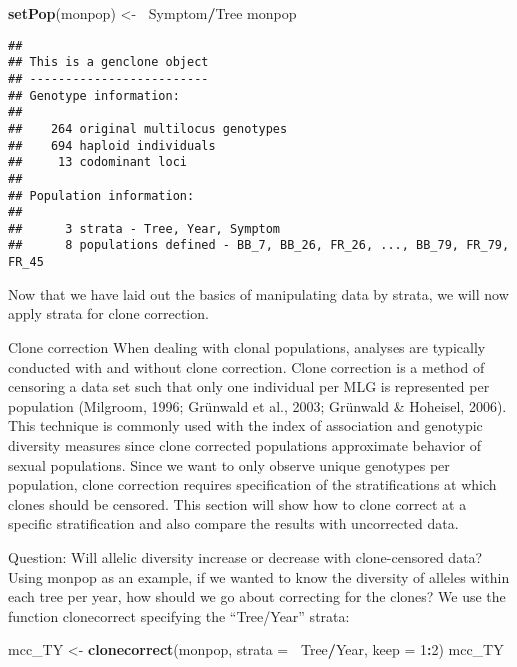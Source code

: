 \documentclass[12pt,]{krantz}
\newenvironment{Shaded}{\begin{snugshade}}{\end{snugshade}}
\newcommand{\KeywordTok}[1]{\textcolor[rgb]{0.27,0.27,0.27}{\textbf{#1}}}
\newcommand{\DataTypeTok}[1]{\textcolor[rgb]{0.27,0.27,0.27}{#1}}
\newcommand{\DecValTok}[1]{\textcolor[rgb]{0.06,0.06,0.06}{#1}}
\newcommand{\StringTok}[1]{\textcolor[rgb]{0.5,0.5,0.5}{#1}}
\newcommand{\OperatorTok}[1]{\textcolor[rgb]{0.81,0.36,0.00}{\textbf{#1}}}
\newcommand{\ErrorTok}[1]{\textcolor[rgb]{0.64,0.00,0.00}{\textbf{#1}}}
\newcommand{\NormalTok}[1]{#1}
\theoremstyle{definition}
\theoremstyle{definition}
\theoremstyle{definition}
\theoremstyle{remark}
\begin{document}
\begin{Shaded}
\begin{Highlighting}[]
\KeywordTok{setPop}\NormalTok{(monpop) <-}\StringTok{ }\ErrorTok{~}\NormalTok{Symptom}\OperatorTok{/}\NormalTok{Tree}
\NormalTok{monpop}
\end{Highlighting}
\end{Shaded}

\begin{verbatim}
## 
## This is a genclone object
## -------------------------
## Genotype information:
## 
##    264 original multilocus genotypes 
##    694 haploid individuals
##     13 codominant loci
## 
## Population information:
## 
##      3 strata - Tree, Year, Symptom
##      8 populations defined - BB_7, BB_26, FR_26, ..., BB_79, FR_79, FR_45
\end{verbatim}

Now that we have laid out the basics of manipulating data by strata, we
will now apply strata for clone correction.

Clone correction When dealing with clonal populations, analyses are
typically conducted with and without clone correction. Clone correction
is a method of censoring a data set such that only one individual per
MLG is represented per population (Milgroom, 1996; Grünwald et al.,
2003; Grünwald \& Hoheisel, 2006). This technique is commonly used with
the index of association and genotypic diversity measures since clone
corrected populations approximate behavior of sexual populations. Since
we want to only observe unique genotypes per population, clone
correction requires specification of the stratifications at which clones
should be censored. This section will show how to clone correct at a
specific stratification and also compare the results with uncorrected
data.

Question: Will allelic diversity increase or decrease with
clone-censored data? Using monpop as an example, if we wanted to know
the diversity of alleles within each tree per year, how should we go
about correcting for the clones? We use the function clonecorrect
specifying the ``Tree/Year'' strata:

\begin{Shaded}
\begin{Highlighting}[]
\NormalTok{mcc_TY <-}\StringTok{ }\KeywordTok{clonecorrect}\NormalTok{(monpop, }\DataTypeTok{strata =} \OperatorTok{~}\NormalTok{Tree}\OperatorTok{/}\NormalTok{Year, }\DataTypeTok{keep =} \DecValTok{1}\OperatorTok{:}\DecValTok{2}\NormalTok{)}
\NormalTok{mcc_TY}
\end{Highlighting}
\end{Shaded}
\end{document}
